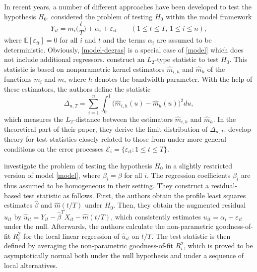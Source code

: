 \documentclass[a4paper,12pt]{article}
\begin{document}
In recent years, a number of different approaches have been developed to test the hypothesis $H_0$. \cite{DegrasWu2012} considered the problem of testing $H_0$ within the model framework
\begin{equation}\label{model-degras}
Y_{it} = m_i \Big( \frac{t}{T} \Big) + \alpha_i + \varepsilon_{it} \qquad (1 \le t \le T, \, 1 \le i \le n), 
\end{equation}
where $\mathbb{E}[\varepsilon_{it}] = 0$ for all $i$ and $t$ and the terms $\alpha_i$ are assumed to be deterministic. Obviously, \eqref{model-degras} is a special case of \eqref{model} which does not include additional regressors. \cite{DegrasWu2012} construct an $L_2$-type statistic to test $H_0$. This statistic is based on nonparametric kernel estimators $\widehat{m}_{i,h}$ and $\widehat{m}_h$ of the functions $m_i$ and $m$, where $h$ denotes the bandwidth parameter. With the help of these estimators, the authors define the statistic
\[ \Delta_{n,T} = \sum_{i=1}^n \int_0^1 \big(\widehat{m}_{i,h}(u) - \widehat{m}_h(u)\big)^2 du, \] 
which measures the $L_2$-distance between the estimators $\widehat{m}_{i, h}$ and $\widehat{m}_h$. In the theoretical part of their paper, they derive the limit distribution of $\Delta_{n,T}$. 
\cite{ChenWu2018} develop theory for test statistics closely related to those from \cite{DegrasWu2012} under more general conditions on the error processes $\mathcal{E}_i = \{ \varepsilon_{it}: 1 \le t \le T \}$. 

\cite{Zhang2012} investigate the problem of testing the hypothesis $H_0$ in a slightly restricted version of model \eqref{model}, where $\beta_i = \beta$ for all $i$. The regression coefficients $\beta_i$ are thus assumed to be homogeneous in their setting. They construct a residual-based test statistic as follows. First, the authors obtain the profile least squares estimates $\widehat{\beta}$ and $\widehat{m}(t/T)$ under $H_0$. Then, they obtain the augmented residual $\widehat{u}_{it}$ by $\widehat{u}_{it} = Y_{it} - \widehat{\beta}^T X_{it} - \widehat{m}(t/T)$, which consistently estimates $u_{it} = \alpha_i + \varepsilon_{it}$ under the null. Afterwards, the authors calculate the non-parametric goodness-of-fit $R_i^2$ for the local linear regression of $\widehat{u}_{it}$ on $t/T$. The test statistic is then defined by averaging the non-parametric goodness-of-fit $R^2_i$, which is proved to be asymptotically normal both under the null hypothesis and under a sequence of local alternatives.
\end{document}
